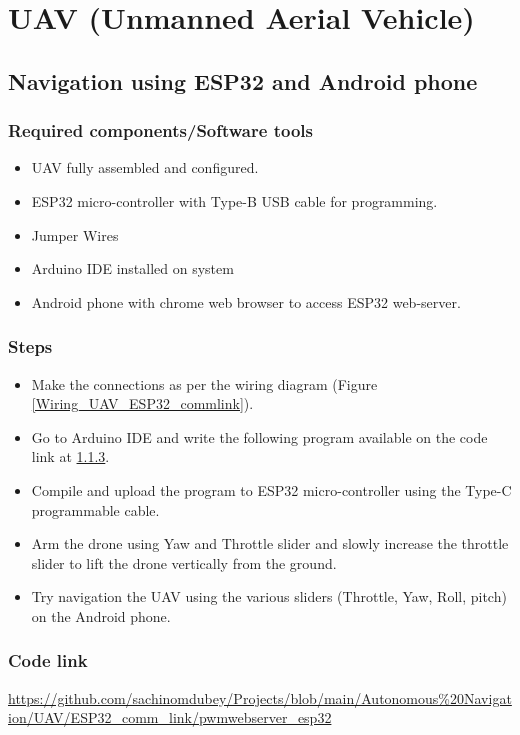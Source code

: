 \section{UAV (Unmanned Aerial Vehicle)}
\subsection{Navigation using ESP32 and Android phone} 
\subsubsection{Required components/Software tools}
\begin{itemize}
    \item UAV fully assembled and configured.
    \item ESP32 micro-controller with Type-B USB cable for programming.
    \item Jumper Wires
    \item Arduino IDE installed on system
    \item Android phone with chrome web browser to access ESP32 web-server.
\end{itemize}

\subsubsection{Steps}
\begin{itemize}
    \item Make the connections as per the wiring diagram (Figure \ref{Wiring_UAV_ESP32_commlink}).
    \item Go to Arduino IDE and write the following program available on the code link at \ref{Code_link_UAV_ESP32_commlink}.
    \item Compile and upload the program to ESP32 micro-controller using the Type-C programmable cable. 
    \item Arm the drone using Yaw and Throttle slider and slowly increase the throttle slider to lift the drone vertically from the ground.
    \item Try navigation the UAV using the various sliders (Throttle, Yaw, Roll, pitch) on the Android phone.
\end{itemize}

\subsubsection{Code link} \label{Code_link_UAV_ESP32_commlink}
\begin{tcolorbox}
\url{https://github.com/sachinomdubey/Projects/blob/main/Autonomous\%20Navigation/UAV/ESP32_comm_link/pwmwebserver_esp32}
\end{tcolorbox}

